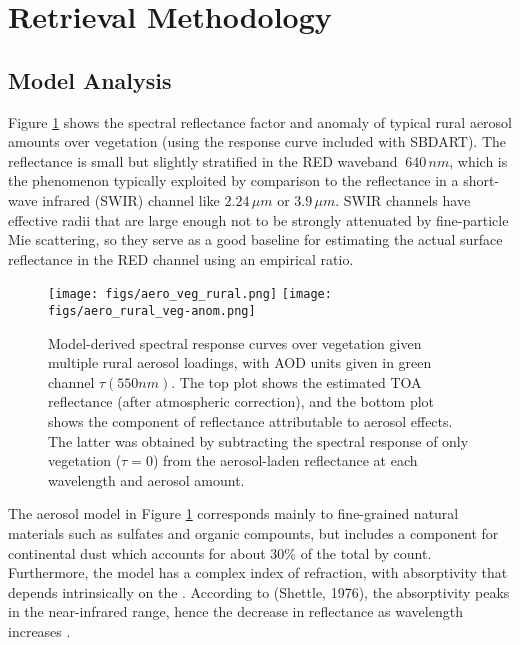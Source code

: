 \documentclass[12pt]{article}
\begin{document}
\section{Retrieval Methodology}

\subsection{Model Analysis}

Figure \ref{rural-response} shows the spectral reflectance factor and anomaly of typical rural aerosol amounts over vegetation (using the response curve included with SBDART). The reflectance is small but slightly stratified in the RED waveband $~640\,\si{nm}$, which is the phenomenon typically exploited by comparison to the reflectance in a short-wave infrared (SWIR) channel like $2.24\,\si{\mu m}$ or $3.9\,\si{\mu m}$. SWIR channels have effective radii that are large enough not to be strongly attenuated by fine-particle Mie scattering, so they serve as a good baseline for estimating the actual surface reflectance in the RED channel using an empirical ratio.

\begin{figure}[h!]
    \centering
    \begin{center}
        \texttt{[image: figs/aero\_veg\_rural.png]}
        \texttt{[image: figs/aero\_rural\_veg-anom.png]}
    \end{center}
    \caption{Model-derived spectral response curves over vegetation given multiple rural aerosol loadings, with AOD units given in green channel $\tau(550nm)$. The top plot shows the estimated TOA reflectance (after atmospheric correction), and the bottom plot shows the component of reflectance attributable to aerosol effects. The latter was obtained by subtracting the spectral response of only vegetation ($\tau=0$) from the aerosol-laden reflectance at each wavelength and aerosol amount.}
    \label{rural-response}
\end{figure}

\clearpage

The aerosol model in Figure \ref{rural-response} corresponds mainly to fine-grained natural materials such as sulfates and organic compounts, but includes a component for continental dust which accounts for about $30\%$ of the total by count. Furthermore, the model has a complex index of refraction, with absorptivity that depends intrinsically on the \cite{remer_modis_2005}. According to (Shettle, 1976), the absorptivity peaks in the near-infrared range, hence the decrease in reflectance as wavelength increases \cite{shettle_models_1976}.
\end{document}

